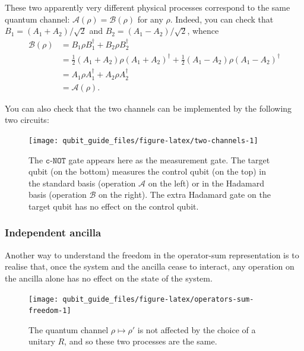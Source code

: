 \documentclass[fleqn,a4paper]{article}
\theoremstyle{definition}
\theoremstyle{definition}
\theoremstyle{definition}
\theoremstyle{definition}
\theoremstyle{remark}
\begin{document}
These two apparently very different physical processes correspond to the same quantum channel: \(\mathcal{A}(\rho)=\mathcal{B}(\rho)\) for any \(\rho\).
Indeed, you can check that \(B_1=(A_1+A_2)/\sqrt{2}\) and \(B_2=(A_1-A_2)/\sqrt{2}\), whence
\[
  \begin{aligned}
    \mathcal{B}(\rho)
    &= B_1\rho B_1^\dagger + B_2\rho B_2^\dagger
  \\&= \frac{1}{2} (A_1+A_2)\rho (A_1+A_2)^\dagger + \frac{1}{2} (A_1-A_2)\rho (A_1-A_2)^\dagger
  \\&=  A_1\rho A_1^\dagger + A_2\rho A_2^\dagger
  \\&= \mathcal{A}(\rho).
  \end{aligned}
\]

You can also check that the two channels can be implemented by the following two circuits:



\begin{figure}[H]

{\centering \texttt{[image: qubit\_guide\_files/figure-latex/two-channels-1]} 

}

\caption{The \(\texttt{c-NOT}\) gate appears here as the measurement gate. The target qubit (on the bottom) measures the control qubit (on the top) in the standard basis (operation \(\mathcal{A}\) on the left) or in the Hadamard basis (operation \(\mathcal{B}\) on the right). The extra Hadamard gate on the target qubit has no effect on the control qubit.}\label{fig:two-channels}
\end{figure}

\hypertarget{independent-ancilla}{%
\subsubsection{Independent ancilla}\label{independent-ancilla}}

Another way to understand the freedom in the operator-sum representation is to realise that, once the system and the ancilla cease to interact, any operation on the ancilla alone has no effect on the state of the system.



\begin{figure}[H]

{\centering \texttt{[image: qubit\_guide\_files/figure-latex/operators-sum-freedom-1]} 

}

\caption{The quantum channel \(\rho\mapsto\rho'\) is not affected by the choice of a unitary \(R\), and so these two processes are the same.}\label{fig:operators-sum-freedom}
\end{figure}
\end{document}
